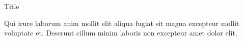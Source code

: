 \documentclass[final]{beamer}
\newlength{\onecolwid}
\newlength{\twocolwid}
\begin{document}
\begin{frame}[t]
\begin{columns}[t]
    \begin{column}{\twocolwid} %
    
        \begin{columns}[t,totalwidth=\twocolwid] %
        
        \begin{column}{\onecolwid}\vspace{-.6in} %
        
            
            \begin{block}{Title}
            
                Qui irure laborum anim mollit elit aliqua fugiat sit magna excepteur mollit voluptate et. Deserunt cillum minim laboris non excepteur amet dolor elit. 


\end{block}
\end{column}
\end{columns}
\end{column}
\end{columns}
\end{frame}
\end{document}
